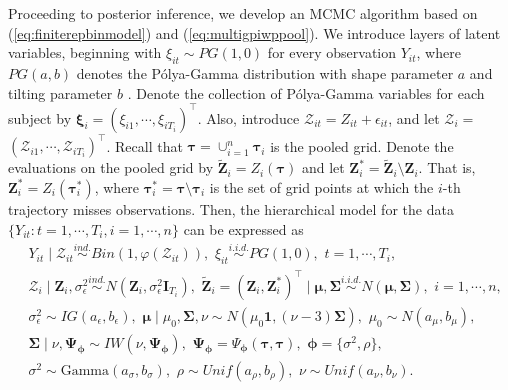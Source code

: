 Proceeding to posterior inference, we develop an MCMC algorithm based on 
(\ref{eq:finiterepbinmodel}) and (\ref{eq:multigpiwppool}). We introduce layers of 
latent variables,  beginning with $\xi_{it}\sim PG(1,0)$ for every observation $Y_{it}$, 
where $PG(a,b)$ denotes the Pólya-Gamma distribution with shape parameter $a$ and 
tilting parameter $b$ \citep{Polson2013}. Denote the collection of Pólya-Gamma variables 
for each subject by $\boldsymbol{\xi}_i=(\xi_{i1},\cdots,\xi_{iT_i})^{\top}$. Also, 
introduce $\mathcal{Z}_{it}=Z_{it}+\epsilon_{it}$, and let $\boldsymbol{\mathcal{Z}}_i=$
$(\mathcal{Z}_{i1},\cdots,\mathcal{Z}_{iT_i})^{\top}$. Recall 
that $\boldsymbol{\tau}=\cup_{i=1}^n\boldsymbol{\tau}_i$ is the pooled grid. Denote 
the evaluations on the pooled grid by $\tilde{\mathbf{Z}}_i=Z_i(\boldsymbol{\tau})$ 
and let $\mathbf{Z}_i^*=\tilde{\mathbf{Z}}_i\setminus\mathbf{Z}_i$. 
That is, $\mathbf{Z}_i^*=Z_i(\boldsymbol{\tau}_i^*)$,
where $\boldsymbol{\tau}_i^*=\boldsymbol{\tau}\setminus\boldsymbol{\tau}_i$ is the set 
of grid points at which the $i$-th trajectory misses observations. Then, the hierarchical 
model for the data $\{Y_{it}: t=1,\cdots,T_i, i=1,\cdots,n\}$ can be expressed as 
\begin{equation*}
    \begin{split}
        &Y_{it}\mid\mathcal{Z}_{it}\stackrel{ind.}{\sim} Bin(1,\varphi(\mathcal{Z}_{it})),\,\,\xi_{it}\stackrel{i.i.d.}{\sim} PG(1,0),\,\, t=1,\cdots,T_i,\\
        &\boldsymbol{\mathcal{Z}}_i\mid \mathbf{Z}_i,\sigma_{\epsilon}^2\stackrel{ind.}{\sim} N(\mathbf{Z}_i,\sigma_{\epsilon}^2\mathbf{I}_{T_i}),\,\, \tilde{\mathbf{Z}}_i=(\mathbf{Z}_i,\mathbf{Z}_i^*)^{\top}\mid\boldsymbol{\mu},\boldsymbol{\Sigma}\stackrel{i.i.d.}{\sim}N(\boldsymbol{\mu},\boldsymbol{\Sigma}),\,\, i=1,\cdots,n,\\
        &\sigma_{\epsilon}^2\sim IG(a_{\epsilon},b_{\epsilon}),\,\,\boldsymbol{\mu}\mid \mu_0,\boldsymbol{\Sigma},\nu\sim N(\mu_0\mathbf{1},(\nu-3)\boldsymbol{\Sigma}),\,\,\mu_0\sim N(a_{\mu},b_{\mu}),\\
        & \boldsymbol{\Sigma}\mid \nu,\boldsymbol{\Psi}_{\boldsymbol{\phi}}\sim IW(\nu,\boldsymbol{\Psi}_{\boldsymbol{\phi}}),\,\,\boldsymbol{\Psi}_{\boldsymbol{\phi}}=\Psi_{\boldsymbol{\phi}}(\boldsymbol{\tau},\boldsymbol{\tau}),\,\, \boldsymbol{\phi}=\{\sigma^2,\rho\},\\
        & \sigma^2\sim \text{Gamma}(a_{\sigma},b_{\sigma}),\,\,\rho\sim Unif(a_{\rho},b_{\rho}),\,\,\nu\sim Unif(a_{\nu},b_{\nu}).
    \end{split}
    \label{eq:hiermodelbin}
\end{equation*}
